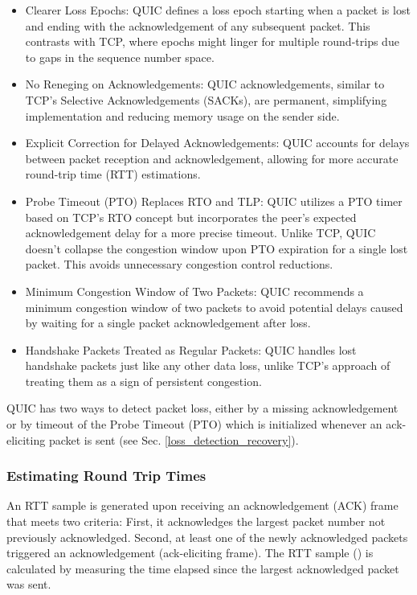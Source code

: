 \begin{itemize}
    \item Clearer Loss Epochs: QUIC defines a loss epoch starting when a packet is lost and ending with the acknowledgement of any subsequent
    packet. This contrasts with TCP, where epochs might linger for multiple round-trips due to gaps in the sequence number space.
    \item No Reneging on Acknowledgements: QUIC acknowledgements, similar to TCP's Selective Acknowledgements (SACKs), are permanent, simplifying
    implementation and reducing memory usage on the sender side.
    \item Explicit Correction for Delayed Acknowledgements: QUIC accounts for delays between packet reception and acknowledgement, allowing for
    more accurate round-trip time (RTT) estimations.
    \item Probe Timeout (PTO) Replaces RTO and TLP: QUIC utilizes a PTO timer based on TCP's RTO concept but incorporates the peer's expected
    acknowledgement delay for a more precise timeout. Unlike TCP, QUIC doesn't collapse the congestion window upon PTO expiration for a
    single lost packet. This avoids unnecessary congestion control reductions.
    \item Minimum Congestion Window of Two Packets: QUIC recommends a minimum congestion window of two packets to avoid potential delays caused
    by waiting for a single packet acknowledgement after loss.
    \item Handshake Packets Treated as Regular Packets: QUIC handles lost handshake packets just like any other data loss, unlike TCP's approach
    of treating them as a sign of persistent congestion.
\end{itemize}

QUIC has two ways to detect packet loss, either by a missing acknowledgement or by timeout of the Probe Timeout (PTO) which is initialized
whenever an ack-eliciting packet is sent (see Sec. \ref{loss_detection_recovery}).

\subsubsection{Estimating Round Trip Times}

An RTT sample is generated upon receiving an acknowledgement (ACK) frame that meets two criteria:
First, it acknowledges the largest packet number not previously acknowledged.
Second, at least one of the newly acknowledged packets triggered an acknowledgement (ack-eliciting frame).
The RTT sample () is calculated by measuring the time elapsed since the largest acknowledged packet was sent.

